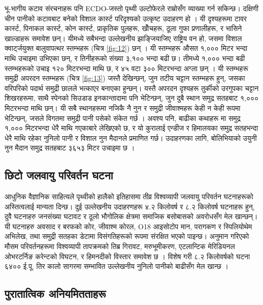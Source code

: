 \documentclass[10pt,twocolumn,letterpaper]{article}
\begin{document}
भू-भागीय कटाव संरचनाहरू पनि ECDO-जस्तो पृथ्वी उल्टोफेरले राम्रोसँग व्याख्या गर्न सकिन्छ। दक्षिणी चीन पानीको कटावबाट बनेको विशाल कार्स्ट परिदृश्यको उत्कृष्ट उदाहरण हो \cite{82}। यी दृश्यहरूमा टावर कार्स्ट, पिनाकल कार्स्ट, कोन कार्स्ट, प्राकृतिक पुलहरू, खोँचहरू, ठूला गुफा प्रणालीहरू, र भासिने खाल्डाहरू समावेश छन्। यीमध्ये सबैभन्दा उल्लेखनीय झाङ्जियाजिए राष्ट्रिय वन हो, जसमा विशाल क्वार्ट्जयुक्त बालुवापत्थर स्तम्भहरू (चित्र \ref{fig:12}) छन् \cite{84}। यी स्तम्भहरू औसत १,००० मिटर भन्दा माथि उचाइमा उभिएका छन्, र तिनीहरूको संख्या ३,१०० भन्दा बढी छ। तीमध्ये १,००० भन्दा बढी स्तम्भहरूको उचाइ १२० मिटरभन्दा माथि छ, र ४५ वटा ३०० मिटरभन्दा अग्ला छन् \cite{85}। यी स्तम्भहरू समुद्री अपरदन स्तम्भहरू (चित्र \ref{fig:13}) जस्तै देखिन्छन्, जुन तटीय चट्टान स्तम्भहरू हुन्, जसका वरिपरिको पदार्थ समुद्री छालले भत्काएर बनाएका हुन्छन्। यस्तै अपरदन दृश्यहरू तुर्कीको उरगुपका चट्टान शिखरहरूमा, साथै स्पेनको सिउडाड इनकान्तादामा पनि भेटिन्छन्, जुन दुबै स्थान समुद्र सतहबाट १,००० मिटरभन्दा माथि छन्। यी सबै स्थानहरूमा नजिकै नै नुन र समुद्री जीवाश्महरू केही न केही रूपमा भेटिन्छन्, जसले विगतमा समुद्री पानी पसेको संकेत गर्छ \cite{15,86,87}। अवश्य पनि, बाढीका कथाहरू \cite{3} मा समुद्र १,००० मिटरभन्दा धेरै माथि गएकाबारे लेखिएको छ, र यो कुरालाई एन्डीज र हिमालयका समुद्र सतहभन्दा धेरै माथि रहेका नुनिलो पानी र विशाल नुन मैदानले प्रमाणित गर्छ। उदाहरणका लागि, बोलिभियाको उयुनी नुन मैदान समुद्र सतहबाट ३६५३ मिटर उचाइमा छ \cite{94}।

\subsection{छिटो जलवायु परिवर्तन घटना}
आधुनिक वैज्ञानिक साहित्यले पृथ्वीको हालैको इतिहासमा तीव्र विश्वव्यापी जलवायु परिवर्तन घटनाहरूको अस्तित्वलाई मान्यता दिन्छ। दुई उल्लेखनीय उदाहरणहरू ४.२ किलोवर्ष र ८.२ किलोवर्ष घटनाहरू हुन्, दुवै घटनाहरु जनसंख्या घटावट र ठूलो भौगोलिक क्षेत्रमा समाजिक बसोबासको अवरोधसँग मेल खान्छन्। यी घटनाहरु अवसाद र बरफको कोर, जीवाश्म कोरल, O18 आइसोटोप मान, परागकण र स्पिलियोथेम अभिलेख, तथा समुद्री सतहका डेटामा विसंगतिहरूको रूपमा संरक्षित भएको पाइन्छ। अनुमान गरिएको मौसम परिवर्तनहरूमा विश्वव्यापी तापक्रमको तिब्र गिरावट, मरुभूमीकरण, एटलान्टिक मेरिडियनल ओभरटर्निङ करेन्टको विघटन, र हिमनदीको विस्तार समावेश छ \cite{90,91,92}। विशेष गरी ८.२ किलोवर्षको घटना ६४०० ई.पू.  तिर कालो सागरमा सम्भावित उल्लेखनीय नुनिलो पानीको बाढीसँग मेल खान्छ \cite{93}।

\subsection{पुरातात्विक अनियमितताहरू}
\end{document}

